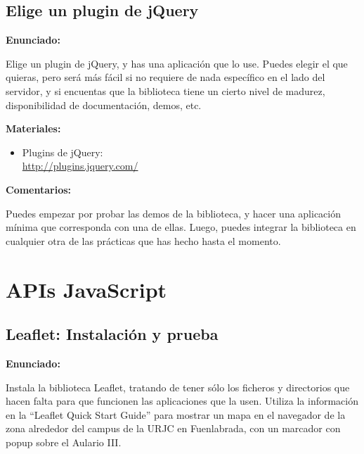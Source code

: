 \subsection{Elige un plugin de jQuery}
\label{subsec:otras-jquery-plugin}

\textbf{Enunciado:}

Elige un plugin de jQuery, y has una aplicación que lo use. Puedes elegir el que quieras, pero será más fácil si no requiere de nada específico en el lado del servidor, y si encuentas que la biblioteca tiene un cierto nivel de madurez, disponibilidad de documentación, demos, etc.

\textbf{Materiales:}

\begin{itemize}
\item Plugins de jQuery: \\
  \url{http://plugins.jquery.com/}
\end{itemize}

\textbf{Comentarios:}

Puedes empezar por probar las demos de la biblioteca, y hacer una aplicación mínima que corresponda con una de ellas. Luego, puedes integrar la biblioteca en cualquier otra de las prácticas que has hecho hasta el momento.

\section{APIs JavaScript}

\subsection{Leaflet: Instalación y prueba}
\label{subsec:apis-leaflet-instal}

\textbf{Enunciado:}

Instala la biblioteca Leaflet, tratando de tener sólo los ficheros y directorios que hacen falta para que funcionen las aplicaciones que la usen. Utiliza la información en la ``Leaflet Quick Start Guide'' para mostrar un mapa en el navegador de la zona alrededor del campus de la URJC en Fuenlabrada, con un marcador con popup sobre el Aulario III.

